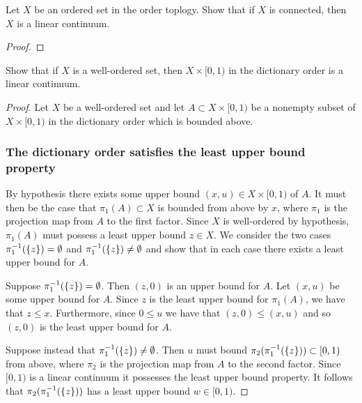 \begin{exercise}[ID=3.24.4]
  Let $X$ be an ordered set in the order toplogy.
  Show that if $X$ is connected, then $X$ is a linear continuum.
\end{exercise}
%
\begin{solution}
  \begin{proof}
  \end{proof}
\end{solution}
\newpage

\begin{exercise}[ID=3.24.6]
  Show that if $X$ is a well-ordered set, then $X \times [0, 1)$ in the dictionary order is a linear continuum.
\end{exercise}
%
\begin{solution}
  \begin{proof}
    Let $X$ be a well-ordered set and let $A \subset X \times [0, 1)$ be a nonempty subset of $X \times [0, 1)$ in the dictionary order which is bounded above.

    \subsubsection*{The dictionary order satisfies the least upper bound property}
    By hypothesis there exists some upper bound $(x, u) \in X \times [0, 1)$ of $A$.
    It must then be the case that $\pi_1(A) \subset X$ is bounded from above by $x$, where $\pi_1$ is the projection map from $A$ to the first factor.
    Since $X$ is well-ordered by hypothesis, $\pi_1(A)$ must possess a least upper bound $z \in X$.
    We consider the two cases $\pi_1^{-1}(\{z\}) = \emptyset$ and $\pi_1^{-1}(\{z\}) \neq \emptyset$ and show that in each case there exists a least upper bound for $A$.
    
    Suppose $\pi_1^{-1}(\{z\}) = \emptyset$.
    Then $(z, 0)$ is an upper bound for $A$.
    Let $(x, u)$ be some upper bound for $A$.
    Since $z$ is the least upper bound for $\pi_1(A)$, we have that $z \leq x$.
    Furthermore, since $0 \leq u$ we have that $(z, 0) \leq (x, u)$ and so $(z, 0)$ is the least upper bound for $A$.

    Suppose instead that $\pi_1^{-1}(\{z\}) \neq \emptyset$.
    Then $u$ must bound $\pi_2(\pi_1^{-1}(\{z\})) \subset [0, 1)$ from above, where $\pi_2$ is the projection map from $A$ to the second factor.
    Since $[0, 1)$ is a linear continuum it possesses the least upper bound property.
    It follows that $\pi_2(\pi_1^{-1}(\{z\}))$ has a least upper bound $w \in [0, 1)$.


\end{proof}
\end{solution}
